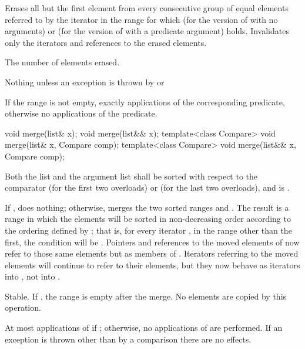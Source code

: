 \begin{itemdescr}
\pnum
\effects
Erases all but the first element from every
consecutive group of equal elements referred to by the iterator  in the range
 for which  (for the version of
 with no arguments) or  (for the version of
 with a predicate argument) holds.
Invalidates only the iterators and references to the erased elements.

\pnum
\returns
The number of elements erased.

\pnum
\throws
Nothing unless an exception is thrown by
or

\pnum
\complexity
If the range
\tcode{[first, last)}
is not empty, exactly
applications of the corresponding predicate,
otherwise no applications of the predicate.
\end{itemdescr}

%
\begin{itemdecl}
void merge(list& x);
void merge(list&& x);
template<class Compare> void merge(list& x, Compare comp);
template<class Compare> void merge(list&& x, Compare comp);
\end{itemdecl}

\begin{itemdescr}
\pnum
\expects
Both the list and the argument list
shall be sorted with respect to
the comparator  (for the first two overloads) or
 (for the last two overloads), and
 is .

\pnum
\effects
If , does nothing; otherwise, merges the two sorted ranges \tcode{[begin(),
end())} and \tcode{[x.\brk{}begin(), x.end())}. The result is a range in which the elements
will be sorted in non-decreasing order according to the ordering defined by ; that
is, for every iterator , in the range other than the first, the condition
 will be .
Pointers and references to the moved elements of  now refer to those same elements
but as members of . Iterators referring to the moved elements will continue to
refer to their elements, but they now behave as iterators into , not into
.

\pnum
\remarks
Stable. If , the range \tcode{[x.begin(), x.end())}
is empty after the merge.
No elements are copied by this operation.

\pnum
\complexity
At most
applications of  if
;
otherwise, no applications of  are performed.
If an exception is thrown other than by a comparison there are no effects.
\end{itemdescr}

